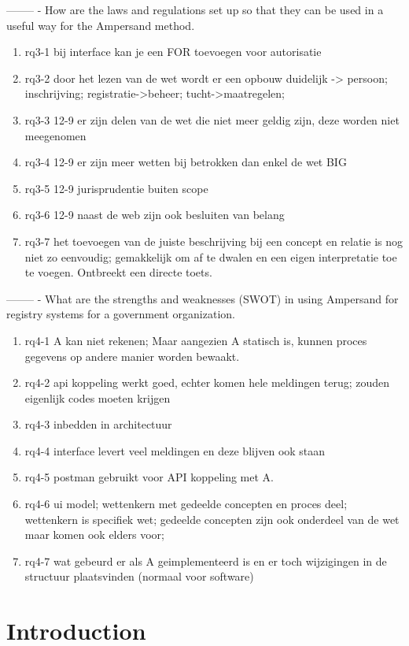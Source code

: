 --------
\newline
[RQ3]- How are the laws and regulations set up so that they can be used in a useful way for the Ampersand method.
\begin{enumerate}
    \item rq3-1 bij interface kan je een FOR toevoegen voor autorisatie
    \item rq3-2 door het lezen van de wet wordt er een opbouw duidelijk -> persoon; inschrijving; registratie->beheer; tucht->maatregelen; 
    \item rq3-3 12-9 er zijn delen van de wet die niet meer geldig zijn, deze worden niet meegenomen
    \item rq3-4 12-9 er zijn meer wetten bij betrokken dan enkel de wet BIG
    \item rq3-5 12-9 jurisprudentie buiten scope
    \item rq3-6 12-9 naast de web zijn ook besluiten van belang
    \item rq3-7 het toevoegen van de juiste beschrijving bij een concept en relatie is nog niet zo eenvoudig; gemakkelijk om af te dwalen en een eigen interpretatie toe te voegen. Ontbreekt een directe toets.
\end{enumerate}
--------
\newline
[RQ4]- What are the strengths and weaknesses (SWOT) in using Ampersand for registry systems for a government organization.
\begin{enumerate}
    \item rq4-1 A kan niet rekenen; Maar aangezien A statisch is, kunnen proces gegevens op andere manier worden bewaakt.
    \item rq4-2 api koppeling werkt goed, echter komen hele meldingen terug; zouden eigenlijk codes moeten krijgen 
    \item rq4-3 inbedden in architectuur 
    \item rq4-4 interface levert veel meldingen en deze blijven ook staan
    \item rq4-5 postman gebruikt voor API koppeling met A. 
    \item rq4-6 ui model; wettenkern met gedeelde concepten en proces deel; wettenkern is specifiek wet; gedeelde concepten zijn ook onderdeel van de wet maar komen ook elders voor;
    \item rq4-7 wat gebeurd er als A geimplementeerd is en er toch wijzigingen in de structuur plaatsvinden (normaal voor software)
\end{enumerate}

\newpage
\section{Introduction}

